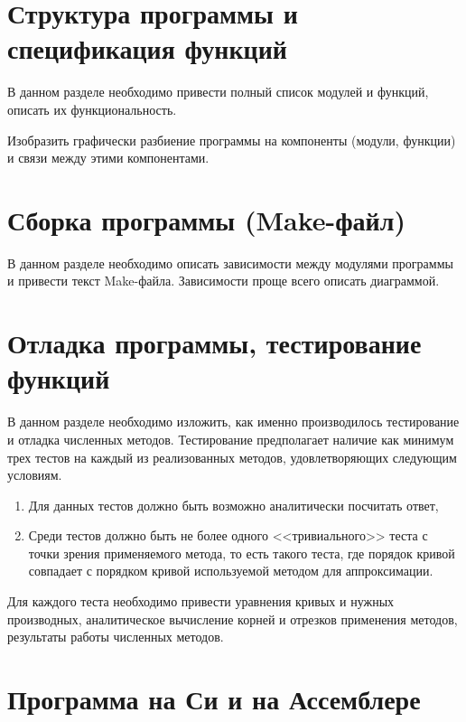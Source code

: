 \documentclass[a4paper,12pt,titlepage,final]{article}
\begin{document}
\newpage

\section{Структура программы и спецификация функций}

В данном разделе необходимо привести полный список модулей и функций,
описать их функциональность.

Изобразить графически разбиение программы на компоненты (модули, функции)
и связи между этими компонентами.

\newpage

\section{Сборка программы (Make-файл)}

В данном разделе необходимо описать зависимости между модулями программы
и привести текст Make-файла. Зависимости проще всего описать диаграммой.

\newpage

\section{Отладка программы, тестирование функций}

В данном разделе необходимо изложить, как именно производилось тестирование
и отладка численных методов. Тестирование предполагает наличие как минимум
трех тестов на каждый из реализованных методов, удовлетворяющих следующим
условиям.
\begin{enumerate}
\item Для данных тестов должно быть возможно аналитически посчитать ответ,
\item Среди тестов должно быть не более одного <<тривиального>> теста
    с точки зрения применяемого метода, то есть такого теста, где порядок
    кривой совпадает с порядком кривой используемой методом для аппроксимации.
\end{enumerate}

Для каждого теста необходимо привести уравнения кривых и нужных производных,
аналитическое вычисление корней и отрезков применения методов, результаты
работы численных методов.

\newpage

\section{Программа на Си и на Ассемблере}
\end{document}
